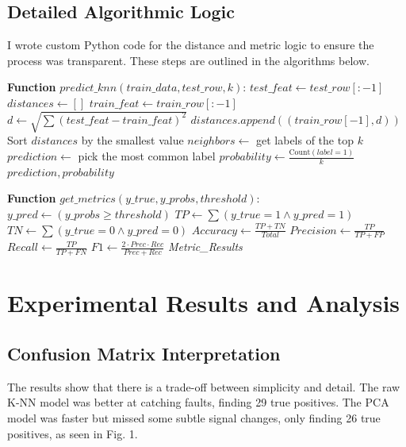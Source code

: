 \documentclass[conference]{IEEEtran}
\begin{document}
\subsection{Detailed Algorithmic Logic}
I wrote custom Python code for the distance and metric logic to ensure the process was transparent. These steps are outlined in the algorithms below.

\begin{algorithm}
\caption{K-NN Classification Logic}
\begin{algorithmic}[1]
\STATE \textbf{Function} $predict\_knn(train\_data, test\_row, k)$:
\STATE $test\_feat \leftarrow test\_row[:-1]$
\STATE $distances \leftarrow []$
    \STATE $train\_feat \leftarrow train\_row[:-1]$
    \STATE $d \leftarrow \sqrt{\sum (test\_feat - train\_feat)^2}$
    \STATE $distances.append((train\_row[-1], d))$
\ENDFOR
\STATE Sort $distances$ by the smallest value
\STATE $neighbors \leftarrow$ get labels of the top $k$
\STATE $prediction \leftarrow$ pick the most common label
\STATE $probability \leftarrow \frac{\text{Count}(label=1)}{k}$
\RETURN $prediction, probability$
\end{algorithmic}
\end{algorithm}

\begin{algorithm}
\caption{Metric Calculation Process}
\begin{algorithmic}[1]
\STATE \textbf{Function} $get\_metrics(y\_true, y\_probs, threshold)$:
\STATE $y\_pred \leftarrow (y\_probs \geq threshold)$
\STATE $TP \leftarrow \sum (y\_true=1 \land y\_pred=1)$
\STATE $TN \leftarrow \sum (y\_true=0 \land y\_pred=0)$
\STATE $Accuracy \leftarrow \frac{TP+TN}{Total}$
\STATE $Precision \leftarrow \frac{TP}{TP+FP}$
\STATE $Recall \leftarrow \frac{TP}{TP+FN}$
\STATE $F1 \leftarrow \frac{2 \cdot Prec \cdot Rec}{Prec+Rec}$
\RETURN \textit{Metric\_Results}
\end{algorithmic}
\end{algorithm}

\section{Experimental Results and Analysis}

\subsection{Confusion Matrix Interpretation}
The results show that there is a trade-off between simplicity and detail. The raw K-NN model was better at catching faults, finding 29 true positives. The PCA model was faster but missed some subtle signal changes, only finding 26 true positives, as seen in Fig. 1.
\end{document}
